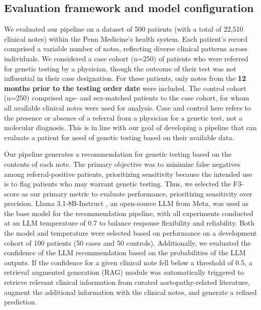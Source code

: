 \documentclass[fleqn,10pt]{wlscirep}
\begin{document}
\subsection*{Evaluation framework and model configuration}
We evaluated our pipeline on a dataset of 500 patients (with a total of 22,510 clinical notes) within the Penn Medicine's health system. Each patient’s record comprised a variable number of notes, reflecting diverse clinical patterns across individuals. We considered a case cohort (n=250) of patients who were referred for genetic testing by a physician, though the outcome of their test was not influential in their case designation. For these patients, only notes from the \textbf{12 months prior to the testing order date} were included. The control cohort (n=250) comprised age- and sex-matched patients to the case cohort, for whom all available clinical notes were used for analysis. Case and control here refers to the presence or absence of a referral from a physician for a genetic test, not a molecular diagnosis. This is in line with our goal of developing a pipeline that can evaluate a patient for need of genetic testing based on their available data.

Our pipeline generates a recommendation for genetic testing based on the contents of each note. The primary objective was to minimize false negatives among referral-positive patients, prioritizing sensitivity because the intended use is to flag patients who may warrant genetic testing.  Thus, we selected the F3-score as our primary metric to evaluate performance, prioritizing sensitivity over precision. Llama 3.1-8B-Instruct \cite{grattafiori2024llama}, an open-source LLM from Meta, was used as the base model for the recommendation pipeline, with all experiments conducted at an LLM temperature of 0.7 to balance response flexibility and reliability. Both the model and temperature were selected based on performance on a development cohort of 100 patients (50 cases and 50 controls). Additionally, we evaluated the confidence of the LLM recommendation based on the probabilities of the LLM outputs. If the confidence for a given clinical note fell below a threshold of 0.5, a retrieval augmented generation (RAG) \cite{lewis2020retrieval} module was automatically triggered to retrieve relevant clinical information from curated aortopathy-related literature, augment the additional information with the clinical notes, and generate a refined prediction.
\end{document}
